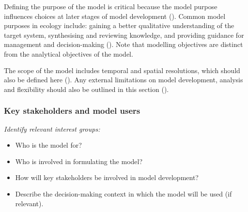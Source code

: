 \documentclass[
]{article}
\providecommand{\tightlist}{%
  \setlength{\itemsep}{0pt}\setlength{\parskip}{0pt}}
\begin{document}
\begin{tcolorbox}[enhanced jigsaw, opacitybacktitle=0.6, bottomrule=.15mm, leftrule=.75mm, rightrule=.15mm, colbacktitle=quarto-callout-note-color!10!white, toprule=.15mm, titlerule=0mm, left=2mm, colframe=quarto-callout-note-color-frame, breakable, title=\textcolor{quarto-callout-note-color}{\faInfo}\hspace{0.5em}{Rationale \& Explanation}, opacityback=0, coltitle=black, bottomtitle=1mm, colback=white, toptitle=1mm, arc=.35mm]

Defining the purpose of the model is critical because the model purpose
influences choices at later stages of model development
(). Common model
purposes in ecology include: gaining a better qualitative understanding
of the target system, synthesising and reviewing knowledge, and
providing guidance for management and decision-making
(). Note that
modelling objectives are distinct from the analytical objectives of the
model.

The scope of the model includes temporal and spatial resolutions, which
should also be defined here (). Any external limitations on model development, analysis and
flexibility should also be outlined in this section
().

\end{tcolorbox}

\subsubsection{Key stakeholders and model
users}\label{key-stakeholders-and-model-users}

\begin{tcolorbox}[enhanced jigsaw, opacitybacktitle=0.6, bottomrule=.15mm, leftrule=.75mm, rightrule=.15mm, colbacktitle=quarto-callout-caution-color!10!white, toprule=.15mm, titlerule=0mm, left=2mm, colframe=quarto-callout-caution-color-frame, breakable, title=\textcolor{quarto-callout-caution-color}{\faFire}\hspace{0.5em}{Preregistration Item}, opacityback=0, coltitle=black, bottomtitle=1mm, colback=white, toptitle=1mm, arc=.35mm]

\emph{Identify relevant interest groups:}

\begin{itemize}
\tightlist
\item[$\square$]
  Who is the model for?
\item[$\square$]
  Who is involved in formulating the model?
\item[$\square$]
  How will key stakeholders be involved in model development?
\item[$\square$]
  Describe the decision-making context in which the model will be used
  (if relevant).
\end{itemize}

\end{tcolorbox}
\end{document}
